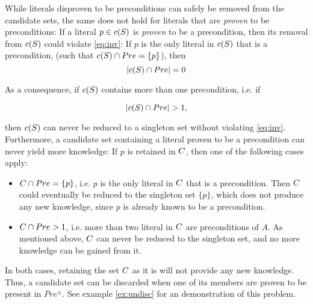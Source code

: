 \documentclass[\master/Master.tex]{subfiles}
\begin{document}
While literals disproven to be preconditions can safely be removed from the candidate sets, the same does not hold for literals that are \emph{proven} to be preconditions:
If a literal $p \in c(S)$ is \textit{proven} to be a precondition, then its removal from $c(S)$ could violate \eqref{eq:inv}: 
If $p$ is the only literal in $c(S)$ that is a precondition, (such that $c(S) \cap Pre = \{ p \}$), then
\begin{equation*}
    \left| c(S) \cap Pre \right| = 0
\end{equation*}

As a consequence, if $c(S)$ contains more than one precondition, i.e. if

\begin{equation*}
    \left| c(S) \cap Pre \right| > 1,
\end{equation*}

then $c(S)$ can never be reduced to a singleton set without violating \eqref{eq:inv}. Furthermore, a candidate set \Cand containing a literal proven to be a precondition can never yield more knowledge: If $p$ is retained in $C$, then one of the following cases apply:
\begin{itemize}
    \item $C \cap Pre = \{ p \}$, i.e. $p$ is the only literal in $C$ that is a precondition. Then $C$ could eventually be reduced to the singleton set $\{ p \}$, which does not produce any new knowledge, since $p$ is already known to be a precondition.

    \item $C \cap Pre > 1$, i.e. more than two literal in $C$ are preconditions of $A$. As mentioned above, $C$ can never be reduced to the singleton set, and no more knowledge can be gained from it.
\end{itemize}
In both cases, retaining the set $C$ as it is will not provide any new knowledge. Thus, a candidate set can be discarded when one of its members are proven to be present in $Pre^{\pm}$. See example \ref{ex:undisc} for an demonstration of this problem.
\end{document}
